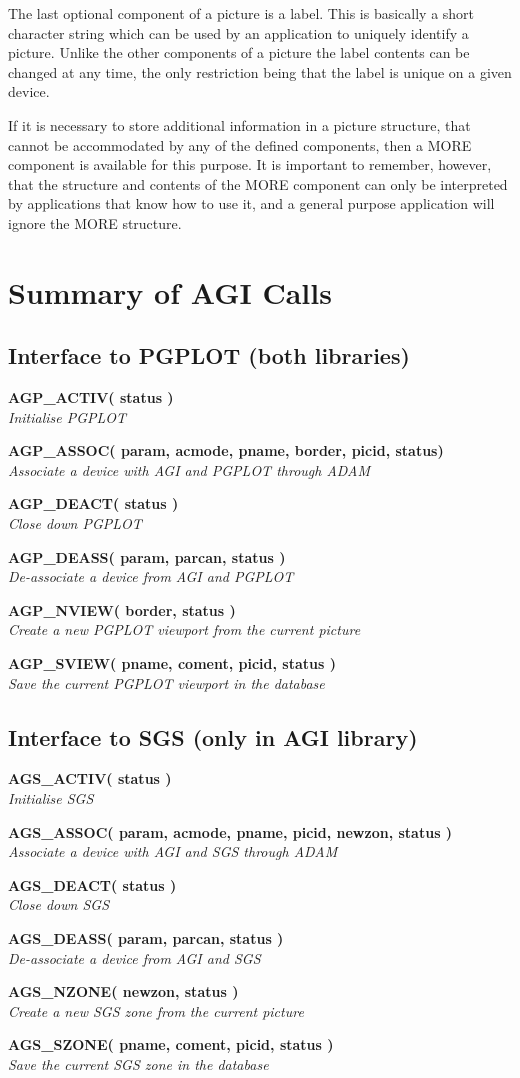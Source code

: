 \documentclass[twoside,11pt]{starlink}
\providecommand{\noteroutine}[2]{\textbf{#1}\hspace*{\fill}\nopagebreak \\
                             \hspace*{3em}\emph{#2}\hspace*{\fill}\par}
\begin{document}
The last optional component of a picture is a label. This is basically a
short character string which can be used by an application to uniquely
identify a picture. Unlike the other components of a picture the label
contents can be changed at any time, the only restriction being that
the label is unique on a given device.

If it is necessary to store additional information in a picture
structure, that cannot be accommodated by any of the defined components,
then a MORE component is available for this purpose. It is important to
remember, however, that the structure and contents of the MORE component
can only be interpreted by applications that know how to use it, and
a general purpose application will ignore the MORE structure.

\section {Summary of AGI Calls}

\subsection{Interface to PGPLOT (both libraries)}
\noteroutine{AGP\_ACTIV( status )}
        {Initialise PGPLOT}
\noteroutine{AGP\_ASSOC( param, acmode, pname, border, picid, status)}
        {Associate a device with AGI and PGPLOT through ADAM}
\noteroutine{AGP\_DEACT( status )}
        {Close down PGPLOT}
\noteroutine{AGP\_DEASS( param, parcan, status )}
        {De-associate a device from AGI and PGPLOT}
\noteroutine{AGP\_NVIEW( border, status )}
        {Create a new PGPLOT viewport from the current picture}
\noteroutine{AGP\_SVIEW( pname, coment, picid, status )}
        {Save the current PGPLOT viewport in the database}
\subsection{Interface to SGS (only in AGI library)}
\noteroutine{AGS\_ACTIV( status )}
        {Initialise SGS}
\noteroutine{AGS\_ASSOC( param, acmode, pname, picid, newzon, status )}
        {Associate a device with AGI and SGS through ADAM}
\noteroutine{AGS\_DEACT( status )}
        {Close down SGS}
\noteroutine{AGS\_DEASS( param, parcan, status )}
        {De-associate a device from AGI and SGS}
\noteroutine{AGS\_NZONE( newzon, status )}
        {Create a new SGS zone from the current picture}
\noteroutine{AGS\_SZONE( pname, coment, picid, status )}
        {Save the current SGS zone in the database}
\end{document}

